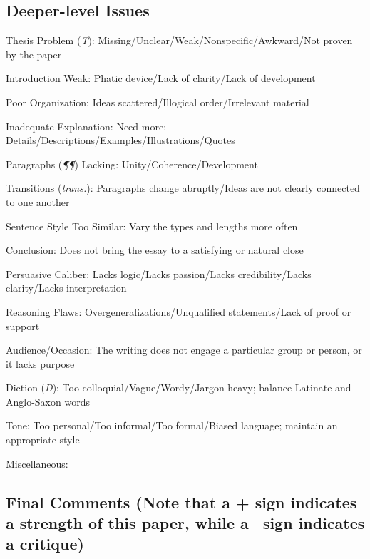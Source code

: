 \documentclass[11pt,twocolumn]{article}
\begin{document}
\subsection*{Deeper-level Issues}

\begin{issues}

\item Thesis Problem (\emph{T}): Missing/Unclear/Weak/Nonspecific/Awkward/Not proven by the paper
\item Introduction Weak: Phatic device/Lack of clarity/Lack of development
\item Poor Organization: Ideas scattered/Illogical order/Irrelevant material
\item Inadequate Explanation: Need more: Details/Descriptions/Examples/Illustrations/Quotes
\item Paragraphs (\emph{\P\P}) Lacking: Unity/Coherence/Development
\item Transitions (\emph{trans.}): Paragraphs change abruptly/Ideas are not clearly connected to one another
\item Sentence Style Too Similar: Vary the types and lengths more often
\item Conclusion: Does not bring the essay to a satisfying or natural close
\item Persuasive Caliber: Lacks logic/Lacks passion/Lacks credibility/Lacks clarity/Lacks interpretation
\item Reasoning Flaws: Overgeneralizations/Unqualified statements/Lack of proof or support
\item Audience/Occasion: The writing does not engage a particular group or person, or it lacks purpose
\item Diction (\emph{D}): Too colloquial/Vague/Wordy/Jargon heavy; balance Latinate and Anglo-Saxon words
\item Tone: Too personal/Too informal/Too formal/Biased language; maintain an appropriate style
\item Miscellaneous:

\end{issues}

\subsection*{Final Comments (Note that a + sign indicates a strength of this paper, while a \textminus\ sign indicates a critique)}


\end{document}
